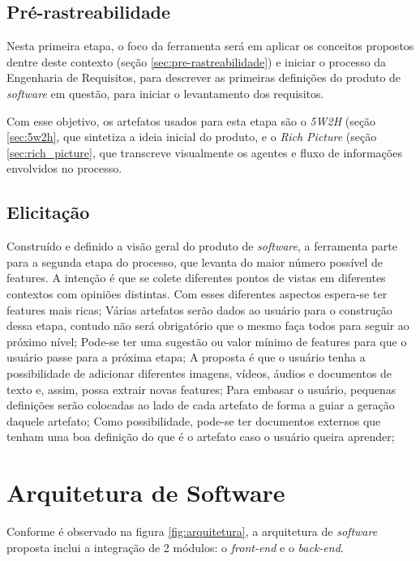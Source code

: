 \subsection{Pré-rastreabilidade}

Nesta primeira etapa, o foco da ferramenta será em aplicar os conceitos propostos dentre deste contexto (seção \ref{sec:pre-rastreabilidade}) e iniciar o processo da Engenharia de Requisitos, para descrever as primeiras definições do produto de \textit{software} em questão, para iniciar o levantamento dos requisitos.

Com esse objetivo, os artefatos usados para esta etapa são o \textit{5W2H} (seção \ref{sec:5w2h}, que sintetiza a ideia inicial do produto, e o \textit{Rich Picture} (seção \ref{sec:rich_picture}, que transcreve visualmente os agentes e fluxo de informações envolvidos no processo.

\subsection{Elicitação}

Construído e definido a visão geral do produto de \textit{software}, a ferramenta parte para a segunda etapa do processo, que levanta do maior número possível de features. A intenção é que se colete diferentes pontos de vistas em diferentes contextos com opiniões distintas. Com esses diferentes aspectos espera-se ter features mais ricas;
Várias artefatos serão dados ao usuário para o construção dessa etapa, contudo não será obrigatório que o mesmo faça todos para seguir ao próximo nível;
Pode-se ter uma sugestão ou valor mínimo de features para que o usuário passe para a próxima etapa;
A proposta é que o usuário tenha a possibilidade de adicionar diferentes imagens, vídeos, áudios e documentos de texto e, assim, possa extrair novas features;
Para embasar o usuário, pequenas definições serão colocadas ao lado de cada artefato de forma a guiar a geração daquele artefato;
Como possibilidade, pode-se ter documentos externos que tenham uma boa definição do que é o artefato caso o usuário queira aprender;


\section{Arquitetura de Software}
Conforme é observado na figura \ref{fig:arquitetura}, a arquitetura de \textit{software} proposta inclui a integração de 2 módulos: o \textit{front-end} e o \textit{back-end}.


